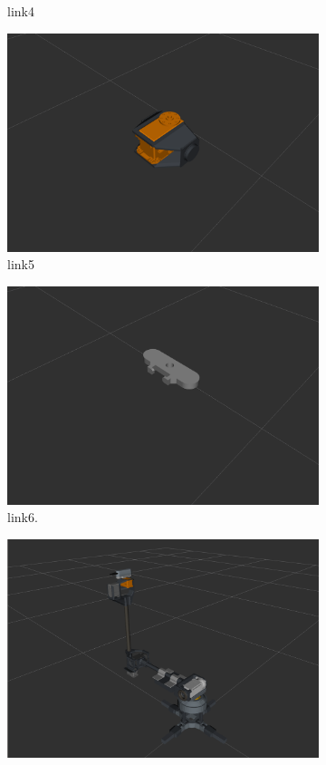 \begin{figure}[h!]
\begin{subfigure}[b]{0.2\linewidth}
    \caption{link4}
  \end{subfigure}
  \begin{subfigure}[b]{0.2\linewidth}
    \includegraphics[width=\linewidth]{link5.png}
    \caption{link5}
  \end{subfigure}
  \begin{subfigure}[b]{0.2\linewidth}
    \includegraphics[width=\linewidth]{link6.png}
    \caption{link6.}
  \end{subfigure}
  \begin{subfigure}[c]{0.4\linewidth}
    \includegraphics[width=\linewidth]{r_mini.png}

\end{subfigure}
\end{figure}
